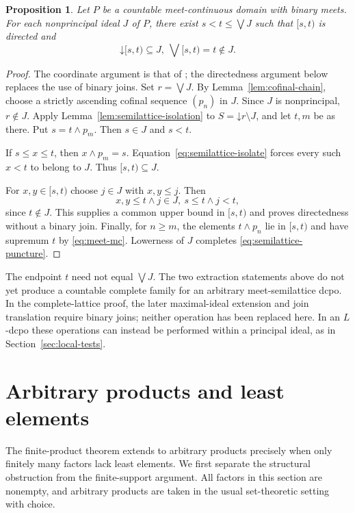 \documentclass[10pt,a4paper]{amsart}
\newtheorem{proposition}[theorem]{Proposition}
\numberwithin{equation}{section}
\newcommand{\down}[1]{\mathord{\downarrow}#1}
\newcommand{\mc}{\wedge}
\begin{document}
\begin{proposition}\label{prop:semilattice-puncture}
Let $P$ be a countable meet-continuous domain with binary meets. For each nonprincipal ideal $J$ of $P$, there exist $s<t\le\bigvee J$ such that $[s,t)$ is directed and
\begin{equation}\label{eq:semilattice-puncture}
 \down[s,t)\subseteq J,~ \bigvee[s,t)=t\notin J.
\end{equation}
\end{proposition}
\begin{proof}
The coordinate argument is that of \cite[Lemma~3.2]{XuJi}; the directedness argument below replaces the use of binary joins. Set $r=\bigvee J$. By Lemma~\ref{lem:cofinal-chain}, choose a strictly ascending cofinal sequence $(p_n)$ in $J$. Since $J$ is nonprincipal, $r\notin J$. Apply Lemma~\ref{lem:semilattice-isolation} to $S=\down r\setminus J$, and let $t,m$ be as there. Put $s=t\mc p_m$. Then $s\in J$ and $s<t$.

If $s\le x\le t$, then $x\mc p_m=s$. Equation~\eqref{eq:semilattice-isolate} forces every such $x<t$ to belong to $J$. Thus $[s,t)\subseteq J$.

For $x,y\in[s,t)$ choose $j\in J$ with $x,y\le j$. Then
\[
 x,y\le t\mc j\in J,~ s\le t\mc j<t,
\]
since $t\notin J$. This supplies a common upper bound in $[s,t)$ and proves directedness without a binary join. Finally, for $n\ge m$, the elements $t\mc p_n$ lie in $[s,t)$ and have supremum $t$ by \eqref{eq:meet-mc}. Lowerness of $J$ completes \eqref{eq:semilattice-puncture}.
\end{proof}

The endpoint $t$ need not equal $\bigvee J$. The two extraction statements above do not yet produce a countable complete family for an arbitrary meet-semilattice dcpo. In the complete-lattice proof, the later maximal-ideal extension and join translation require binary joins; neither operation has been replaced here. In an $L$-dcpo these operations can instead be performed within a principal ideal, as in Section~\ref{sec:local-tests}.

\section{Arbitrary products and least elements}\label{sec:arbitrary-products}
The finite-product theorem extends to arbitrary products precisely when only finitely many factors lack least elements. We first separate the structural obstruction from the finite-support argument. All factors in this section are nonempty, and arbitrary products are taken in the usual set-theoretic setting with choice.
\end{document}

